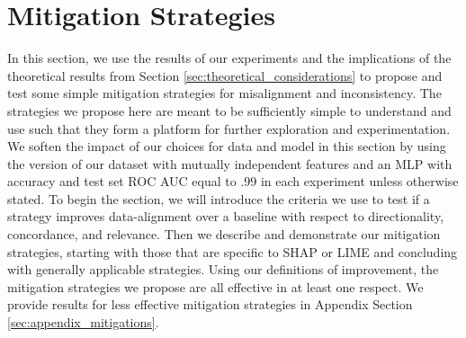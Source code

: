 \documentclass[mnsc,blindrev]{informs3}
\begin{document}
\section{Mitigation Strategies}
    \label{sec:mitigation_strategies}
    In this section, we use the results of our experiments and the implications of the theoretical results from Section \ref{sec:theoretical_considerations} to propose and test some simple mitigation strategies for misalignment and inconsistency. The strategies we propose here are meant to be sufficiently simple to understand and use such that they form a platform for further exploration and experimentation. We soften the impact of our choices for data and model in this section by using the version of our dataset with mutually independent features and an MLP with accuracy and test set ROC AUC equal to $.99$ in each experiment unless otherwise stated. To begin the section, we will introduce the criteria we use to test if a strategy improves data-alignment over a baseline with respect to directionality, concordance, and relevance. Then we describe and demonstrate our mitigation strategies, starting with those that are specific to SHAP or LIME and concluding with generally applicable strategies. Using our definitions of improvement, the mitigation strategies we propose are all effective in at least one respect. We provide results for less effective mitigation strategies in Appendix Section \ref{sec:appendix_mitigations}. 

    
\end{document}
